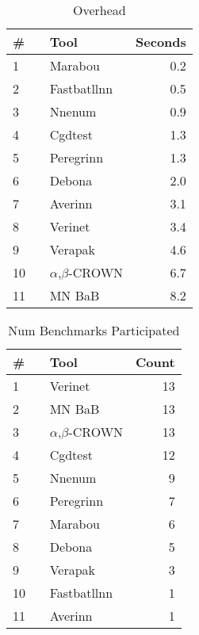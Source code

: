 


\begin{table}[h]
\begin{center}
\caption{Overhead} \label{tab:overhead}
{\setlength{\tabcolsep}{2pt}
\begin{tabular}[h]{@{}llr@{}}
\toprule
\textbf{\# ~} & \textbf{Tool} & \textbf{Seconds}\\
\midrule
1 & Marabou & 0.2 \\
2 & Fastbatllnn & 0.5 \\
3 & Nnenum & 0.9 \\
4 & Cgdtest & 1.3 \\
5 & Peregrinn & 1.3 \\
6 & Debona & 2.0 \\
7 & Averinn & 3.1 \\
8 & Verinet & 3.4 \\
9 & Verapak & 4.6 \\
10 & $\alpha$,$\beta$-CROWN & 6.7 \\
11 & MN BaB & 8.2 \\
\bottomrule
\end{tabular}
}
\end{center}
\end{table}




\begin{table}[h]
\begin{center}
\caption{Num Benchmarks Participated} \label{tab:stats0}
{\setlength{\tabcolsep}{2pt}
\begin{tabular}[h]{@{}llr@{}}
\toprule
\textbf{\# ~} & \textbf{Tool} & \textbf{Count}\\
\midrule
1 & Verinet & 13 \\
2 & MN BaB & 13 \\
3 & $\alpha$,$\beta$-CROWN & 13 \\
4 & Cgdtest & 12 \\
5 & Nnenum & 9 \\
6 & Peregrinn & 7 \\
7 & Marabou & 6 \\
8 & Debona & 5 \\
9 & Verapak & 3 \\
10 & Fastbatllnn & 1 \\
11 & Averinn & 1 \\
\bottomrule
\end{tabular}
}
\end{center}
\end{table}



